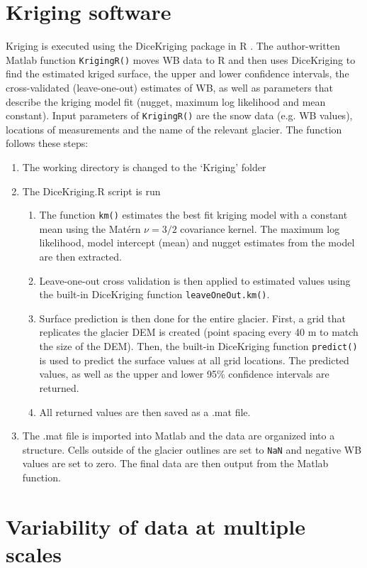 \documentclass{sfuthesis}
\begin{document}
\begin{appendices}
\chapter{Kriging software}
\label{app:KrigingMethods}
Kriging is executed using the DiceKriging package in R \citep{Roustant2012}. The author-written Matlab function \texttt{KrigingR()} moves WB data to R and then uses DiceKriging to find the estimated kriged surface, the upper and lower confidence intervals, the cross-validated (leave-one-out) estimates of WB, as well as parameters that describe the kriging model fit (nugget, maximum log likelihood and mean constant). Input parameters of  \texttt{KrigingR()} are the snow data (e.g. WB values), locations of measurements and the name of the relevant glacier. The function follows these steps:
\begin{enumerate}
\item The working directory is changed to the `Kriging' folder
\item The DiceKriging.R script is run
	\begin{enumerate}
	\item The function \texttt{km()} estimates the best fit kriging model with a constant mean using the Mat\'ern $\nu = 3/2$ covariance kernel. The maximum log likelihood, model intercept (mean) and nugget estimates from the model are then extracted. 
	\item Leave-one-out cross validation is then applied to estimated values using the built-in DiceKriging function \texttt{leaveOneOut.km()}.
	\item Surface prediction is then done for the entire glacier. First, a grid that replicates the glacier DEM is created (point spacing every 40 m to match the size of the DEM). Then, the built-in DiceKriging function \texttt{predict()} is used to predict the surface values at all grid locations. The predicted values, as well as the upper and lower 95\% confidence intervals are returned. 
	\item All returned values are then saved as a .mat file.
	\end{enumerate}
\item The .mat file is imported into Matlab and the data are organized into a structure. Cells outside of the glacier outlines are set to \texttt{NaN} and negative WB values are set to zero. The final data are then output from the Matlab function. 
\end{enumerate}

\chapter{Variability of data at multiple scales}
\label{app:variability_data_multiple_scales}


\end{appendices}
\end{document}
